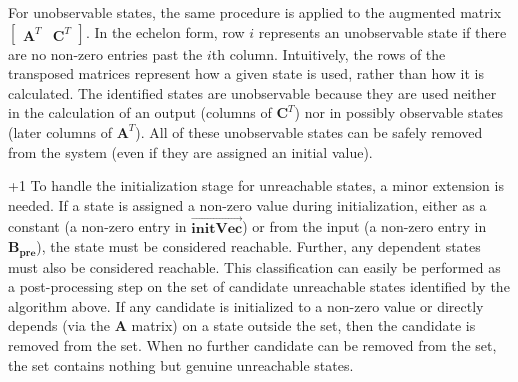 For unobservable states, the same procedure is applied to the
augmented matrix $\left [\begin{array} {cc} \mathbf{A}^T &
\mathbf{C}^T \end{array} \right ]$.  In the echelon form, row $i$
represents an unobservable state if there are no non-zero entries past
the $i$th column.  Intuitively, the rows of the transposed matrices
represent how a given state is used, rather than how it is calculated.
The identified states are unobservable because they are used neither
in the calculation of an output (columns of $\mathbf{C}^T$) nor in
possibly observable states (later columns of $\mathbf{A}^T$).  All of
these unobservable states can be safely removed from the system (even
if they are assigned an initial value).

\looseness+1 To handle the initialization stage for unreachable
states, a minor extension is needed.  If a state is assigned a
non-zero value during initialization, either as a constant (a non-zero
entry in $\overrightarrow{\mathbf{initVec}}$) or from the input (a
non-zero entry in $\mathbf{B_{pre}}$), the state must be considered
reachable.  Further, any dependent states must also be considered
reachable.  This classification can easily be performed as a
post-processing step on the set of candidate unreachable states
identified by the algorithm above.  If any candidate is initialized to
a non-zero value or directly depends (via the $\mathbf{A}$ matrix) on
a state outside the set, then the candidate is removed from the set.
When no further candidate can be removed from the set, the set
contains nothing but genuine unreachable states.


